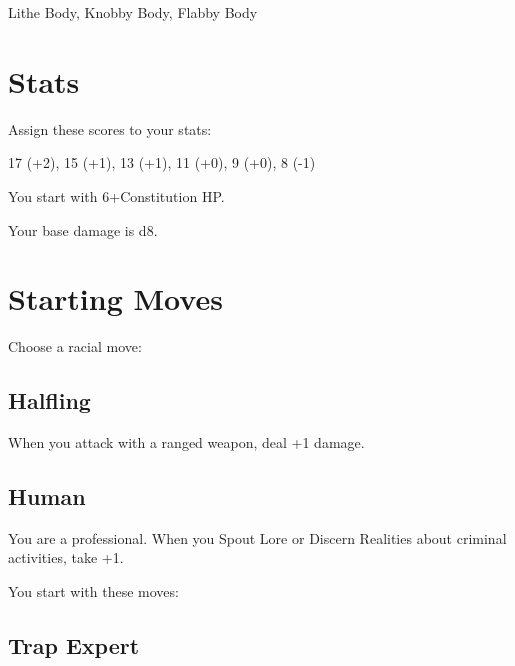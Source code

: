          

Lithe Body, Knobby Body, Flabby Body

       

       
\section{Stats}   
       

         

Assign these scores to your stats:

         

17 (+2), 15 (+1), 13 (+1), 11 (+0), 9 (+0), 8 (-1)

         

You start with 6+Constitution HP.

       

       

Your base damage is d8.

       
\section{Starting Moves}   
       

         
\startInstructionsAfterHeader
Choose a racial move:
\stopInstructionsAfterHeader
         

           
\subsection{Halfling}  
           

When you attack with a ranged weapon, deal +1 damage.

           
\subsection{Human}   
           

You are a professional. When you Spout Lore or Discern Realities about criminal activities, take +1.

         

         

           
\startInstructions
You start with these moves:
\stopInstructions
           
\subsection{Trap Expert}    
           

